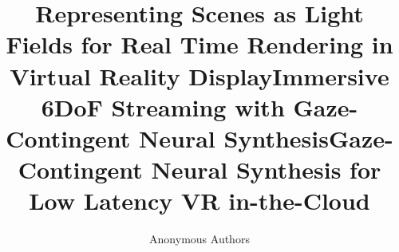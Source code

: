 \title{Representing Scenes as Light Fields for Real Time Rendering in Virtual Reality Display}
\title{Immersive 6DoF Streaming with Gaze-Contingent Neural Synthesis} 
\title{Gaze-Contingent Neural Synthesis for Low Latency VR in-the-Cloud} 




\author{Anonymous Authors}
